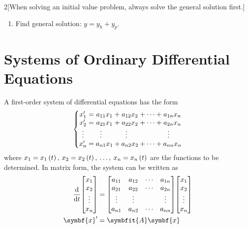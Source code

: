 \documentclass{article}
\begin{document}
\begin{multicols}{2}[When solving an initial value problem, always solve the general solution first.]
\begin{enumerate}[itemsep=1pt, parsep=1pt]
\begin{table}[H]
            {\raggedleft\textit{If $Q(t)$ contains multiple forms, simplify the coefficients before substituting $y_p$.}\par}
        \end{table}
        \item Find general solution: $y = y_h + y_p$.
    \end{enumerate}
\end{multicols}
\section{Systems of Ordinary Differential Equations}
A first-order system of differential equations has the form
\begin{equation*}
    \left\{
        \setlength\arraycolsep{0pt}
        \begin{array}{ c >{{}}c<{{}} c >{{}}c<{{}} c >{{}}c<{{}} c >{{}}c<{{}} c  }
        x'_1               &=& a_{11}x_1                         &+& a_{12}x_2                         &+& \cdots &+& a_{1n}x_n \\
        x'_2               &=& a_{21}x_1                         &+& a_{22}x_2                         &+& \cdots &+& a_{2n}x_n \\
        \vdotswithin{x'_3} & & \vdotswithin{a_{31}}\phantom{x_1} & & \vdotswithin{a_{32}}\phantom{x_2} & &        & & \vdotswithin{a_{3n}}\phantom{x_n} \\ 
        x'_n               &=& a_{n1}x_1                         &+& a_{n2}x_2                         &+& \cdots &+& a_{nn}x_n 
        \end{array}
    \right.
\end{equation*}
where $x_1={x_1}\left({t}\right),\: x_2={x_2}\left({t}\right),\: \dots,\: x_n={x_n}\left({t}\right)$ are the 
functions to be determined. In matrix form, the system can be written as
\begin{align*}
    \dv{t}\mqty[x_1 \\ x_2 \\ \vdots \\ x_n] &= \mqty[
        a_{11} & a_{12} & \cdots & a_{1n} \\
        a_{21} & a_{22} & \cdots & a_{2n} \\
        \vdots & \vdots &        & \vdots \\
        a_{n1} & a_{n2} & \cdots & a_{nn}
    ] \mqty[x_1 \\ x_2 \\ \vdots \\ x_n] \\
    \symbf{x}' &= \symbfit{A} \symbf{x}
\end{align*}
\end{document}

